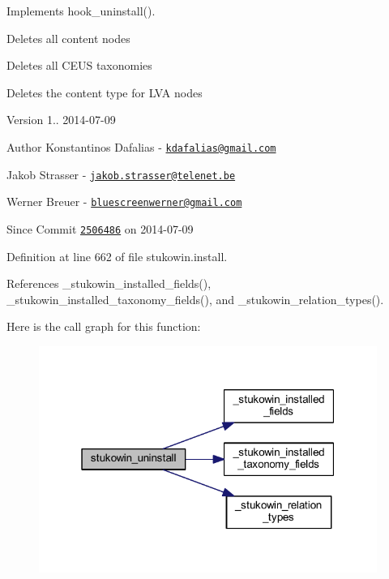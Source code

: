 Implements hook\+\_\+uninstall(). 


\begin{DoxyItemize}
\item Deletes all content nodes
\item Deletes all C\+E\+U\+S taxonomies
\item Deletes the content type for L\+V\+A nodes
\end{DoxyItemize}

\begin{DoxyVersion}{Version}
1.. 2014-\/07-\/09 
\end{DoxyVersion}
\begin{DoxyAuthor}{Author}
Konstantinos Dafalias -\/ \href{mailto:kdafalias@gmail.com}{\tt kdafalias@gmail.\+com} 

Jakob Strasser -\/ \href{mailto:jakob.strasser@telenet.be}{\tt jakob.\+strasser@telenet.\+be} 

Werner Breuer -\/ \href{mailto:bluescreenwerner@gmail.com}{\tt bluescreenwerner@gmail.\+com}
\end{DoxyAuthor}
\begin{DoxySince}{Since}
Commit \href{http://github.com/TheJake123/DrupalModul/commit/2506486a98691dbd0031666d5f932784bd3eede1}{\tt 2506486} on 2014-\/07-\/09 
\end{DoxySince}


Definition at line 662 of file stukowin.\+install.



References \+\_\+stukowin\+\_\+installed\+\_\+fields(), \+\_\+stukowin\+\_\+installed\+\_\+taxonomy\+\_\+fields(), and \+\_\+stukowin\+\_\+relation\+\_\+types().



Here is the call graph for this function\+:
\nopagebreak
\begin{figure}[H]
\begin{center}
\leavevmode
\includegraphics[width=313pt]{group___stukowin___module_gad831696eae7eb1a0e48c4e9621323bca_cgraph}
\end{center}
\end{figure}


